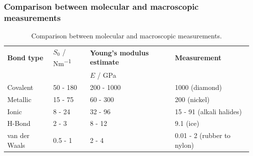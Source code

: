 \subsubsection{Comparison between molecular and macroscopic measurements}
\begin{table}[H]
	\centering
	\begin{tabular}{@{}llll@{}}
		\toprule
		\textbf{Bond type} & $S_0$ / \si{Nm^{-1}} & \textbf{Young's modulus estimate} & \textbf{Measurement}       \\
		                   &                      & $E$ / \si{\giga\pascal}           &                            \\
		\midrule
		Covalent           & 50 - 180             & 200 - 1000                        & 1000 (diamond)             \\
		Metallic           & 15 - 75              & 60 - 300                          & 200 (nickel)               \\
		Ionic              & 8 - 24               & 32 - 96                           & 15 - 91 (alkali halides)   \\
		H-Bond             & 2 - 3                & 8 - 12                            & 9.1 (ice)                  \\
		van der Waals      & 0.5 - 1              & 2 - 4                             & 0.01 - 2 (rubber to nylon)
	\end{tabular}
	\caption{Comparison between molecular and macroscopic measurements.}
\end{table}

